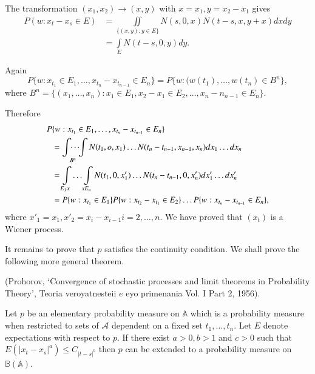 The transformation $(x_1, x_2) \to (x,y)$ with $x = x_1, y= x_2 - x_1$
gives  
\begin{align*}
  P(w : x_t - x_s \in E) & =  \iint\limits_{\{ (x,y) : y \in E \}} N(s,
  0, x) N(t-s, x,y+x) dxdy\\ 
  & = \int\limits_E N(t-s, 0, y) dy.
\end{align*}

Again 
$$
P\{ w: x_{t_{1}} \in E_1, \ldots, x_{t_{n}}-x_{t_{n-1}} \in E_n \}=
P\{w: (w(t_1), \ldots, w(t_n) \in B^n \}, 
$$
where $ B^n = \{(x_1, \ldots,x_n) : x_1 \in E_1, x_2-x_1 \in E_2 ,
\ldots, x_n - n_{n-1} \in E_n \}$. 

Therefore\pageoriginale
\begin{align*}
  P & \{w: x_{t_{1}} \in E_1,\ldots, x_{t_{n}} - x_{t_{n-1}} \in E_n
  \}\\ 
  & = \idotsint\limits_{B^n}  N(t_1, o, x_1) \ldots N(t_n - t_{n-1},
  x_{n-1}, x_n) dx_1 \ldots dx_n\\ 
  & = \int \limits_{E_1 x}\ldots \int \limits_{ x E_n} N(t_1, 0, x'_1)
  \ldots N(t_n - t_{n-1}, 0, x'_n) dx'_1 \ldots dx'_n\\ 
  & = P\{ w: x_{t_{1}} \in E_1 \} P\{ w: x_{t_{2}} - x_{t_{1}} \in
  E_2\} \ldots P\{ w: x_{t_{n}}-x_{t_{n-1}} \in E_n \}, 
\end{align*}
where $x'_1 = x_1, x'_2 = x_i - x_{i -1} i = 2, \ldots , n$. We have
proved that $(x_t)$ is a Wiener process. 

It remains to prove that $p$ satisfies the continuity condition. We
shall prove the following more general theorem. 

\begin{theorem*}
(Prohorov, `Convergence of stochastic processes and limit theorems
  in Probability Theory', Teoria veroyatnesteii $e$ eyo primenania
  Vol. I Part 2, 1956). 
\end{theorem*}

Let $p$ be an elementary probability measure on $\mathbb{A}$ 
which is a probability measure when restricted to sets of $\mathscr{A}$
dependent on a fixed set $t_1, \ldots , t_n$. Let $E$ denote expectations with
respect to $p$. If there exist $a > 0, b>1$ and $c> 0$ such that
$E(|x_t - x_s|^a) \leq C_{|t-s|^b}$ then $p$ can be extended to a
probability measure on $\mathbb{B}(\mathbb{A})$. 

